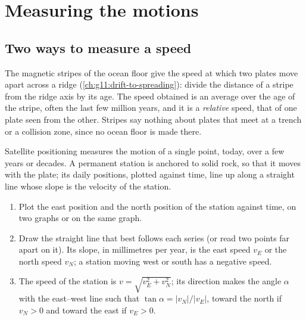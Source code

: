 \section{Measuring the motions}

\subsection{Two ways to measure a speed}

The magnetic stripes of the ocean floor give the speed at which two plates
move apart across a ridge (\cref{ch:g11:drift-to-spreading}): divide the
distance of a stripe from the ridge axis by its age. The speed obtained is an
average over the age of the stripe, often the last few million years, and it
is a \emph{relative} speed, that of one plate seen from the other. Stripes say
nothing about plates that meet at a trench or a collision zone, since no
ocean floor is made there.

Satellite positioning measures the motion of a single point, today, over a
few years or decades. A permanent station is anchored to solid rock, so that
it moves with the plate; its daily positions, plotted against time, line up
along a straight line whose slope is the velocity of the station.

\begin{method}\label{met:g11:plate-motions:rate}
\begin{enumerate}
  \item Plot the east position and the north position of the station against
        time, on two graphs or on the same graph.
  \item Draw the straight line that best follows each series (or read two
        points far apart on it). Its slope, in millimetres per year, is the
        east speed $v_E$ or the north speed $v_N$; a station moving west or
        south has a negative speed.
  \item The speed of the station is $v = \sqrt{v_E^2 + v_N^2}$; its direction
        makes the angle $\alpha$ with the east--west line such that
        $\tan\alpha = |v_N|/|v_E|$, toward the north if $v_N > 0$ and toward
        the east if $v_E > 0$.
\end{enumerate}
\end{method}

